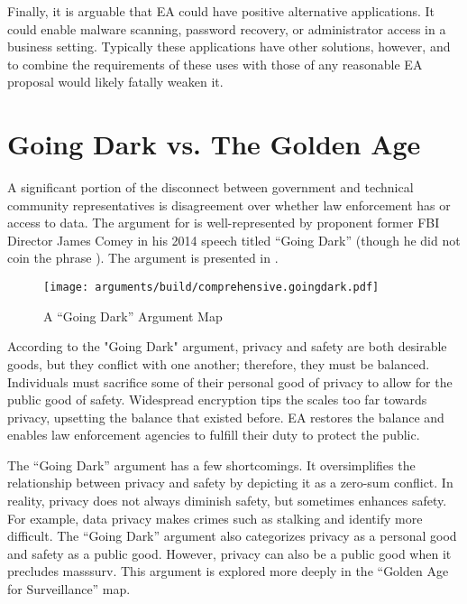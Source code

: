 Finally, it is arguable that \ac{EA} could have positive alternative applications. It could enable malware scanning,
password recovery, or administrator access in a business setting. Typically these applications have other solutions,
however, and to combine the requirements of these uses with those of any reasonable \ac{EA} proposal would likely
fatally weaken it.


\section{Going Dark vs. The Golden Age}

A significant portion of the disconnect between government and technical community representatives is disagreement over
whether law enforcement has  or  access to data. The argument for  is
well-represented by proponent former \ac{FBI} Director James Comey in his 2014 speech titled ``Going Dark''
\cite{comey_2014} (though he did not coin the phrase \cite{swire_encryption_2011}). The argument is presented in
.

\begin{figure}[t!]
  \centering\CaptionFontSize
  \texttt{[image: arguments/build/comprehensive.goingdark.pdf]}
  \caption{A ``Going Dark'' Argument Map}
  \label{fig-arg-going-dark}
\end{figure}

According to the "Going Dark" argument, privacy and safety are both desirable goods, but they conflict with one another;
therefore, they must be balanced. Individuals must sacrifice some of their personal good of privacy to allow for the
public good of safety. Widespread encryption tips the scales too far towards privacy, upsetting the balance that existed
before. \ac{EA} restores the balance and enables law enforcement agencies to fulfill their duty to protect the public.

The ``Going Dark'' argument has a few shortcomings. It oversimplifies the relationship between privacy and safety by
depicting it as a zero-sum conflict. In reality, privacy does not always diminish safety, but sometimes enhances safety.
For example, data privacy makes crimes such as stalking and identify more difficult. The ``Going Dark'' argument also
categorizes privacy as a personal good and safety as a public good. However, privacy can also be a public good when it
precludes \ac{masssurv}. This argument is explored more deeply in the ``Golden Age for Surveillance'' map.

